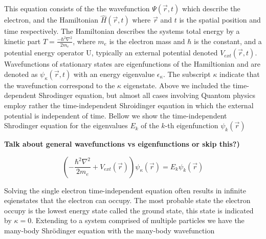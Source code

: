 This equation consists of the the wavefunction $\Psi(\vec{r},t)$ which describe the electron, and the Hamiltonian $\hat{H}(\vec{r},t)$ where $\vec{r}$ and $t$ is the spatial position and time respectively. The Hamiltonian describes the systems total energy by a kinetic part $T = \frac{-\hbar^2\nabla^2}{2m_e}$, where $m_e$ is the electron mass and $\hbar$ is the constant, and a potential energy operator U, typically an external potential denoted $V_{ext}(\vec{r}, t)$. Wavefunctions of stationary states are eigenfunctions of the Hamiltionian and are denoted as $\psi_{\kappa}(\vec{r}, t)$ with an energy eigenvalue $\epsilon_{\kappa}$. The subscript $\kappa$ indicate that the wavefunction correspond to the $\kappa$ eigenstate. Above we included the time-dependent Shrodinger equation, but almost all cases involving Quantom physics employ rather the time-independent Shroidinger eqaution in which the external potential is independent of time. Bellow we show the time-independent Shrodinger equation for the eigenvalues $E_k$ of the $k$-th eigenfunction $\psi_k(\vec{r})$

\textbf{Talk about general wavefunctions vs eigenfunctions or skip this?)}

\begin{equation}
	\left(-\frac{\hbar^2\nabla^2}{2m_e} + V_{ext}(\vec{r}) \right)\psi_{\kappa}(\vec{r}) = E_k \psi_k(\vec{r})
\end{equation}

Solving the single electron time-independent equation often results in infinite eqienstates that the electron can occupy. The most probable state the electron occupy is the lowest energy state called the ground state, this state is indicated by $\kappa = 0$. Extending to a system comprised of multiple particles we have the many-body Shr\"{o}dinger equation with the many-body wavefunction 

